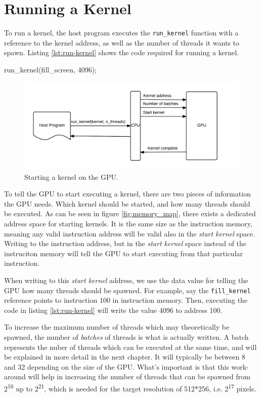 \section{Running a Kernel}
To run a kernel, the host program executes the \verb/run_kernel/ function with a reference to the kernel address, as well as the number of threads it wants to spawn.
Listing \ref{lst:run-kernel} shows the code required for running a kernel.

\begin{c-code}[caption=Running a kernel, label=lst:run-kernel]
run_kernel(fill_screen, 4096);
\end{c-code}

\begin{figure}[H]
    \centering
    \includegraphics[width=\textwidth]{../cpu/diagrams/running_a_kernel.png}
    \caption{Starting a kernel on the GPU.}
    \label{fig:running_a_kernel}
\end{figure}

To tell the GPU to start executing a kernel,
there are two pieces of information the GPU needs.
Which kernel should be started, and how many threads should be executed.
As can be seen in figure \ref{fig:memory_map}, there exists a dedicated address space for starting kernels.
It is the same size as the instruction memory,
meaning any valid instruction address will be valid also in the \emph{start kernel} space.
Writing to the instruction address,
but in the \emph{start kernel} space instead of the instruciton memory will tell the GPU to start executing from that particular instruction.

When writing to this \emph{start kernel} address, we use the data value for telling the GPU how many threads should be spawned.
For example, say the \verb/fill_kernel/ reference points to instruction 100 in instruction memory.
Then, executing the code in listing \ref{lst:run-kernel} will write the value 4096 to address 100.

To increase the maximum number of threads which may theoretically be spawned,
the number of \emph{batches} of threads is what is actually written.
A batch represents the nuber of threads which can be executed at the same time,
and will be explained in more detail in the next chapter. 
It will typically be between 8 and 32 depending on the size of the GPU.
What's important is that this work-around will help in increasing the number of threads that can be spawned from 2\textsuperscript{16} up to 2\textsuperscript{21},
which is needed for the target resolution of 512*256, i.e. 2\textsuperscript{17} pixels.

